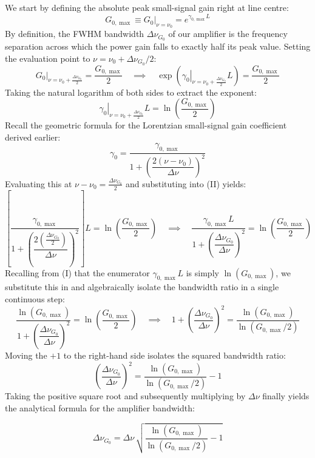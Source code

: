 We start by defining the absolute peak small-signal gain right at line centre:
\begin{equation}
    G_{0,\max} \equiv \left. G_0 \right|_{\nu=\nu_0} = e^{\gamma_{0,\max} L} \tag{I}
\end{equation}
By definition, the FWHM bandwidth $\Delta\nu_{G_0}$ of our amplifier is the frequency separation across which the power gain falls to exactly half its peak value. Setting the evaluation point to $\nu = \nu_0 + \Delta\nu_{G_0}/2$:
\begin{equation*}
    \left. G_0 \right|_{\nu = \nu_0 + \frac{\Delta\nu_{G_0}}{2}} = \frac{G_{0,\max}}{2}
    \quad\implies\quad
    \exp\!\left( \left. \gamma_0 \right|_{\nu = \nu_0 + \frac{\Delta\nu_{G_0}}{2}} L \right) = \frac{G_{0,\max}}{2}
\end{equation*}
Taking the natural logarithm of both sides to extract the exponent:
\begin{equation}
    \left. \gamma_0 \right|_{\nu = \nu_0 + \frac{\Delta\nu_{G_0}}{2}} L = \ln\!\left(\frac{G_{0,\max}}{2}\right) \tag{II}
\end{equation}
Recall the geometric formula for the Lorentzian small-signal gain coefficient derived earlier:
\begin{equation*}
    \gamma_0 = \frac{\gamma_{0,\max}}{1 + \left(\dfrac{2(\nu-\nu_0)}{\Delta\nu}\right)^2}
\end{equation*}
Evaluating this at $\nu - \nu_0 = \frac{\Delta\nu_{G_0}}{2}$ and substituting into \textup{(II)} yields:
\begin{equation*}
    \left[ \frac{\gamma_{0,\max}}{1 + \left(\dfrac{2\left(\frac{\Delta\nu_{G_0}}{2}\right)}{\Delta\nu}\right)^2} \right] L
    = \ln\!\left(\frac{G_{0,\max}}{2}\right)
    \quad\implies\quad
    \frac{\gamma_{0,\max} L}{1 + \left(\dfrac{\Delta\nu_{G_0}}{\Delta\nu}\right)^2}
    = \ln\!\left(\frac{G_{0,\max}}{2}\right)
\end{equation*}
Recalling from \textup{(I)} that the enumerator $\gamma_{0,\max}L$ is simply $\ln(G_{0,\max})$, we substitute this in and algebraically isolate the bandwidth ratio in a single continuous step:
\begin{equation*}
    \frac{\ln(G_{0,\max})}{1 + \left(\dfrac{\Delta\nu_{G_0}}{\Delta\nu}\right)^2} = \ln\!\left(\frac{G_{0,\max}}{2}\right)
    \quad\implies\quad
    1 + \left(\frac{\Delta\nu_{G_0}}{\Delta\nu}\right)^2 = \frac{\ln(G_{0,\max})}{\ln(G_{0,\max}/2)}
\end{equation*}
Moving the $+1$ to the right-hand side isolates the squared bandwidth ratio:
\begin{equation*}
    \left(\frac{\Delta\nu_{G_0}}{\Delta\nu}\right)^2 = \frac{\ln(G_{0,\max})}{\ln(G_{0,\max}/2)} - 1
\end{equation*}
Taking the positive square root and subsequently multiplying by $\Delta\nu$ finally yields the analytical formula for the amplifier bandwidth:
\begin{keyresult}
    \begin{equation}
        \Delta\nu_{G_0}
        = \Delta\nu\,\sqrt{\frac{\ln(G_{0,\max})}{\ln(G_{0,\max}/2)} - 1}
    \end{equation}
\end{keyresult}

